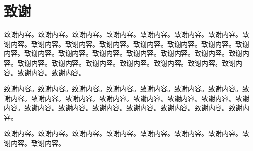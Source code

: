 
\chapter*{致谢}

    {\fs \baselineskip 16pt \fontsize{12}{6} 致谢内容。致谢内容。致谢内容。致谢内容。致谢内容。致谢内容。致谢内容。致谢内容。致谢内容。致谢内容。致谢内容。致谢内容。致谢内容。致谢内容。致谢内容。致谢内容。致谢内容。致谢内容。致谢内容。致谢内容。致谢内容。致谢内容。致谢内容。致谢内容。致谢内容。致谢内容。致谢内容。致谢内容。致谢内容。致谢内容。致谢内容。

    致谢内容。致谢内容。致谢内容。致谢内容。致谢内容。致谢内容。致谢内容。致谢内容。致谢内容。致谢内容。致谢内容。致谢内容。致谢内容。致谢内容。致谢内容。致谢内容。致谢内容。致谢内容。致谢内容。致谢内容。致谢内容。致谢内容。

    致谢内容。致谢内容。致谢内容。致谢内容。致谢内容。致谢内容。致谢内容。致谢内容。致谢内容。}




